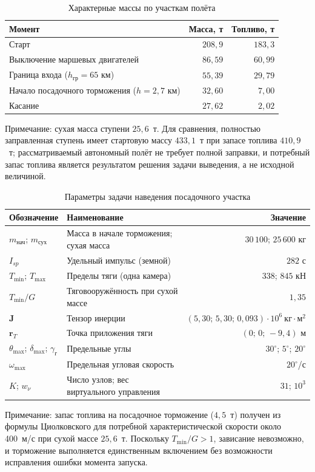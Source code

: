 \documentclass[11pt,a4paper]{article}
\newcommand{\vect}[1]{\bm{#1}}
\begin{document}
\begin{table}[htb]
\centering
\caption{Характерные массы по участкам полёта}
\label{tab:mass}
\begin{tabular}{lrr}
\toprule
Момент & Масса, т & Топливо, т \\
\midrule
Старт & $208{,}9$ & $183{,}3$ \\
Выключение маршевых двигателей & $86{,}59$ & $60{,}99$ \\
Граница входа ($h_{\text{гр}}=65$ км) & $55{,}39$ & $29{,}79$ \\
Начало посадочного торможения ($h=2{,}7$ км) & $32{,}60$ & $7{,}00$ \\
Касание & $27{,}62$ & $2{,}02$ \\
\bottomrule
\end{tabular}

\smallskip
\footnotesize Примечание: сухая масса ступени $25{,}6$~т. Для сравнения,
полностью заправленная ступень имеет стартовую массу $433{,}1$~т при запасе
топлива $410{,}9$~т; рассматриваемый автономный полёт не требует полной
заправки, и потребный запас топлива является результатом решения задачи
выведения, а не исходной величиной.
\end{table}

\begin{table}[htb]
\centering
\caption{Параметры задачи наведения посадочного участка}
\label{tab:par2}
\begin{tabular}{llr}
\toprule
Обозначение & Наименование & Значение \\
\midrule
$m_{\text{нач}}$; $m_{\text{сух}}$ & Масса в начале торможения; сухая масса
 & $30\,100$; $25\,600$ кг \\
$I_{sp}$ & Удельный импульс (земной) & $282$ с \\
$T_{\min}$; $T_{\max}$ & Пределы тяги (одна камера) & $338$; $845$ кН \\
$T_{\min}/G$ & Тяговооружённость при сухой массе & $1{,}35$ \\
$\vect{J}$ & Тензор инерции
 & $(5{,}30;\,5{,}30;\,0{,}093)\cdot10^6\ \text{кг}\cdot\text{м}^2$ \\
$\vect{r}_T$ & Точка приложения тяги & $(0;\,0;\,-9{,}4)$ м \\
$\theta_{\max}$; $\delta_{\max}$; $\gamma_{\text{г}}$ & Предельные углы
 & $30^\circ$; $5^\circ$; $20^\circ$ \\
$\omega_{\max}$ & Предельная угловая скорость & $20^\circ$/с \\
$K$; $w_\nu$ & Число узлов; вес виртуального управления & $31$; $10^3$ \\
\bottomrule
\end{tabular}

\smallskip
\footnotesize Примечание: запас топлива на посадочное торможение ($4{,}5$~т)
получен из формулы Циолковского для потребной характеристической скорости около
400~м/с при сухой массе $25{,}6$~т. Поскольку $T_{\min}/G>1$, зависание
невозможно, и торможение выполняется единственным включением без возможности
исправления ошибки момента запуска.
\end{table}
\end{document}
